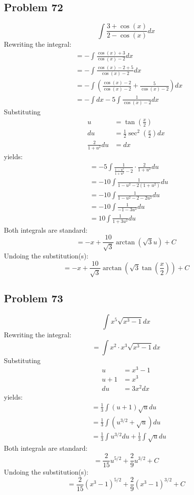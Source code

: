 \documentclass{article}
\begin{document}
\subsection*{Problem 72}
$$\int\frac{3+\cos\left(x\right)}{2-\cos\left(x\right)}dx$$
Rewriting the integral:
\begin{align*}
&=-\int\frac{\cos(x)+3}{\cos(x)-2}dx \\
&=-\int\frac{\cos(x)-2+5}{\cos(x)-2}dx \\
&=-\int\left(\frac{\cos(x)-2}{\cos(x)-2}+\frac{5}{\cos(x)-2}\right)dx \\
&=-\int dx-5\int\frac{1}{\cos(x)-2}dx
\end{align*}
Substituting
\begin{align*}
u&=\tan\left(\frac{x}{2}\right) \\
du&=\frac{1}{2}\sec^2\left(\frac{x}{2}\right)dx \\
\frac{2}{1+u^2}du&=dx
\end{align*}
yields:
\begin{align*}
&=-5\int\frac{1}{\frac{1-u^2}{1+u^2}-2}\cdot\frac{2}{1+u^2}du \\
&=-10\int\frac{1}{1-u^2-2(1+u^2)}du \\
&=-10\int\frac{1}{1-u^2-2-2u^2}du \\
&=-10\int\frac{1}{-1-3u^2}du \\
&=10\int\frac{1}{1+3u^2}du
\end{align*}
Both integrals are standard:
$$=-x+\frac{10}{\sqrt{3}}\arctan\left(\sqrt{3}u\right)+C$$
Undoing the substitution(s):
$$=-x+\frac{10}{\sqrt{3}}\arctan\left(\sqrt{3}\tan\left(\frac{x}{2}\right)\right)+C$$
\subsection*{Problem 73}
$$\int x^5\sqrt{x^3-1}dx$$
Rewriting the integral:
$$=\int x^2\cdot x^3\sqrt{x^3-1}dx$$
Substituting
\begin{align*}
u&=x^3-1 \\
u+1&=x^3 \\
du&=3x^2dx
\end{align*}
yields:
\begin{align*}
&=\frac{1}{3}\int(u+1)\sqrt{u}du \\
&=\frac{1}{3}\int\left(u^{3/2}+\sqrt{u}\right)du \\
&=\frac{1}{3}\int u^{3/2}du+\frac{1}{3}\int\sqrt{u}du
\end{align*}
Both integrals are standard:
$$=\frac{2}{15}u^{5/2}+\frac{2}{9}u^{3/2}+C$$
Undoing the substitution(s):
$$=\frac{2}{15}(x^3-1)^{5/2}+\frac{2}{9}(x^3-1)^{3/2}+C$$
\end{document}
